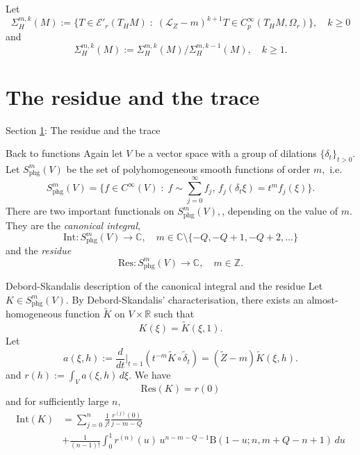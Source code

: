 \documentclass{beamer}
\numberwithin{equation}{section}
\theoremstyle{plain}
\theoremstyle{plain}
\theoremstyle{definition}
\theoremstyle{plain}
\theoremstyle{plain}
\theoremstyle{definition}
\newcommand{\Rl}{\mathbb{R}}
\newcommand{\Cplx}{\mathbb{C}}
\newcommand{\Itgr}{\mathbb{Z}}
\newcommand{\Ec}{\mathcal{E}}
\newcommand{\Lc}{\mathcal{L}}
\newcommand{\phg}{\mathrm{phg}}
\newcommand{\Res}{\mathrm{Res}}
\newcommand{\Int}{\mathrm{Int}}
\newcommand{\Sigmab}{\mathbb{\Sigma}}
\newcommand{\Beta}{\mathrm{B}}
\begin{document}
\begin{frame}
    \begin{definition}
        Let
        \[
            \Sigmab^{m,k}_H(M) := \{T \in \Ec'_r(T_HM)\;:\;(\Lc_Z-m)^{k+1}T \in C^\infty_p(T_HM,\Omega_r)\},\quad k\geq 0
        \]
        and
        \[
            \Sigma^{m,k}_H(M) := \Sigmab^{m,k}_H(M)/\Sigmab^{m,k-1}_H(M),\quad k\geq 1.
        \]
    \end{definition}
\end{frame}


\section{The residue and the trace}\label{residue_section}

\begin{frame}
    \huge{Section \ref{residue_section}: The residue and the trace}
\end{frame}

\begin{frame}{Back to functions}
    Again let $V$ be a vector space with a group of dilations $\{\delta_t\}_{t>0}.$ Let $S^{m}_{\phg}(V)$ be the set of polyhomogeneous smooth functions of order $m,$ i.e.
    \[
        S^{m}_{\phg}(V) = \{f\in C^\infty(V)\;:\; f\sim\sum_{j=0}^\infty f_j,\, f_j(\delta_t\xi)=t^mf_j(\xi)\}.
    \]
    There are two important functionals on $S^{m}_{\phg}(V),$, depending on the value of $m.$ They are the \emph{canonical integral},
    \[
        \Int:S^{m}_{\phg}(V)\to \Cplx,\quad m\in \Cplx\setminus \{-Q,-Q+1,-Q+2,\ldots\}
    \]
    and the \emph{residue}
    \[
        \Res:S^{m}_{\phg}(V)\to\Cplx,\quad m\in \Itgr.
    \]
\end{frame}

\begin{frame}{Debord-Skandalis description of the canonical integral and the residue}
    Let $K\in S^m_{\phg}(V).$ By Debord-Skandalis' characterisation, there exists an almost-homogeneous function $\widetilde{K}$ on $V\times \Rl$ such that
    \[
        K(\xi) = \widetilde{K}(\xi,1).
    \]
    Let
    \[
        a(\xi,h) := \frac{d}{dt}|_{t=1}(t^{-m}\widetilde{K}\circ \widetilde{\delta}_t) = (\widetilde{Z}-m)\widetilde{K}(\xi,h).
    \]
    and $r(h) := \int_{V} a(\xi,h)\,d\xi.$
    We have
    \[
        \Res(K) = r(0)
    \]
    and for sufficiently large $n,$
    \begin{align*}
        \Int(K) &= \sum_{j=0}^n \frac{1}{j!}\frac{r^{(j)}(0)}{j-m-Q}\\
                &+ \frac{1}{(n-1)!}\int_0^1 r^{(n)}(u)\,u^{n-m-Q-1}\Beta(1-u;n,m+Q-n+1)\,du
    \end{align*}
\end{frame}
\end{document}
